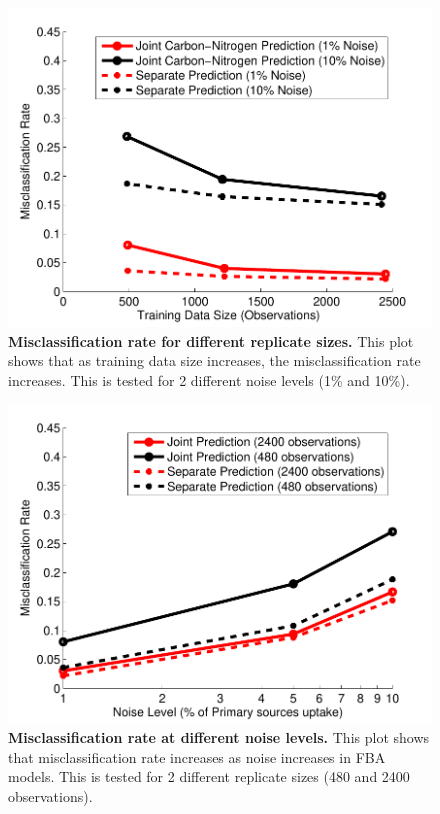 \documentclass[12pt]{article}
\begin{document}
\begin{figure}[!ht]
\begin{center}
\includegraphics[width=6in]{Figures/VaryingData.pdf}
\end{center}
\caption{
{\bf Misclassification rate for different replicate sizes.} This plot shows that as training data size increases, the misclassification rate increases. This is tested for 2 different noise levels (1\% and 10\%). 
}
\label{Figure_label}
\end{figure}

\begin{figure}[!ht]
\begin{center}
\includegraphics[width=6in]{Figures/VaryingNoise.pdf}
\end{center}
\caption{
{\bf Misclassification rate at different noise levels.} This plot shows that misclassification rate increases as noise increases in FBA models. This is tested for 2 different replicate sizes (480 and 2400 observations). 
}
\label{Figure_label}
\end{figure}
\end{document}
